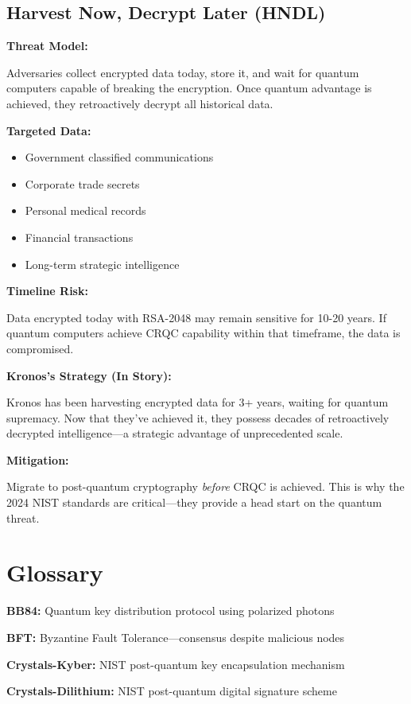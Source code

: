 \documentclass[12pt,oneside]{book}
\begin{document}
\section{Harvest Now, Decrypt Later (HNDL)}

\textbf{Threat Model:}

Adversaries collect encrypted data today, store it, and wait for quantum computers capable of breaking the encryption. Once quantum advantage is achieved, they retroactively decrypt all historical data.

\textbf{Targeted Data:}
\begin{itemize}
\item Government classified communications
\item Corporate trade secrets
\item Personal medical records
\item Financial transactions
\item Long-term strategic intelligence
\end{itemize}

\textbf{Timeline Risk:}

Data encrypted today with RSA-2048 may remain sensitive for 10-20 years. If quantum computers achieve CRQC capability within that timeframe, the data is compromised.

\textbf{Kronos's Strategy (In Story):}

Kronos has been harvesting encrypted data for 3+ years, waiting for quantum supremacy. Now that they've achieved it, they possess decades of retroactively decrypted intelligence—a strategic advantage of unprecedented scale.

\textbf{Mitigation:}

Migrate to post-quantum cryptography \textit{before} CRQC is achieved. This is why the 2024 NIST standards are critical—they provide a head start on the quantum threat.

\chapter{Glossary}

\textbf{BB84:} Quantum key distribution protocol using polarized photons

\textbf{BFT:} Byzantine Fault Tolerance—consensus despite malicious nodes

\textbf{Crystals-Kyber:} NIST post-quantum key encapsulation mechanism

\textbf{Crystals-Dilithium:} NIST post-quantum digital signature scheme
\end{document}
